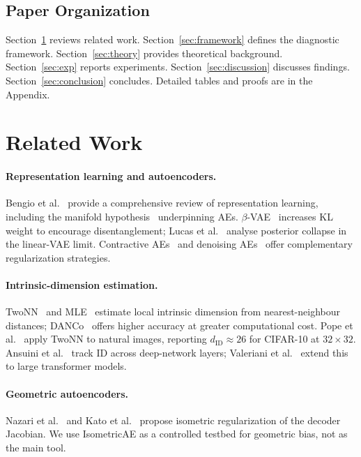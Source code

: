 \documentclass[make,article,submit,pdftex,moreauthors]{Definitions/mdpi}
\begin{document}
\subsection{Paper Organization}\label{sec:intro_org}

Section~\ref{sec:related} reviews related work.
Section~\ref{sec:framework} defines the diagnostic framework.
Section~\ref{sec:theory} provides theoretical background.
Section~\ref{sec:exp} reports experiments.
Section~\ref{sec:discussion} discusses findings.
Section~\ref{sec:conclusion} concludes.
Detailed tables and proofs are in the Appendix.

\section{Related Work}\label{sec:related}

\paragraph{Representation learning and autoencoders.}
Bengio et al.~\cite{bengio2013representation} provide a comprehensive review of
representation learning, including the manifold hypothesis~\cite{fefferman2016manifold}
underpinning AEs.  $\beta$-VAE~\cite{higgins2017betavae} increases KL weight to
encourage disentanglement; Lucas et al.~\cite{lucas2019elbo} analyse posterior
collapse in the linear-VAE limit.  Contractive AEs~\cite{rifai2011cae} and
denoising AEs~\cite{alain2014dae} offer complementary regularization strategies.

\paragraph{Intrinsic-dimension estimation.}
TwoNN~\cite{facco2017twonn} and MLE~\cite{levina2005mle} estimate local
intrinsic dimension from nearest-neighbour distances;
DANCo~\cite{ceruti2014danco} offers higher accuracy at greater computational cost.  Pope et
al.~\cite{pope2021intrinsic} apply TwoNN to natural images, reporting
$d_{\mathrm{ID}}\approx26$ for CIFAR-10 at $32\!\times\!32$.  Ansuini et
al.~\cite{ansuini2019intrinsic} track ID across deep-network layers; Valeriani
et al.~\cite{valeriani2023geometry} extend this to large transformer models.

\paragraph{Geometric autoencoders.}
Nazari et al.~\cite{nazari2023geometric} and Kato et
al.~\cite{kato2020rdae} propose isometric regularization of the decoder Jacobian.
We use IsometricAE as a controlled testbed for geometric bias, not as the main tool.
\end{document}
